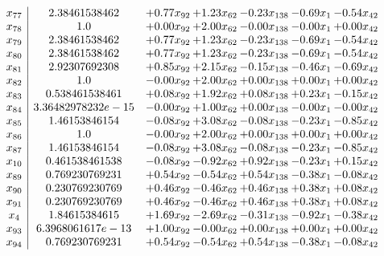 \documentclass[8pt]{article}
\begin{document}
\[\begin{array}{c| c c@{\hskip 2pt} c@{\hskip 2pt} c@{\hskip 2pt} c@{\hskip 2pt} c@{\hskip 2pt} }
 x_{77}   &  2.38461538462 & +  0.77 x_{92} & +  1.23 x_{62} & -0.23 x_{138} & -0.69 x_{1} & -0.54 x_{42}\\
 x_{78}   &  1.0 & +  0.00 x_{92} & +  2.00 x_{62} & -0.00 x_{138} & -0.00 x_{1} & +  0.00 x_{42}\\
 x_{79}   &  2.38461538462 & +  0.77 x_{92} & +  1.23 x_{62} & -0.23 x_{138} & -0.69 x_{1} & -0.54 x_{42}\\
 x_{80}   &  2.38461538462 & +  0.77 x_{92} & +  1.23 x_{62} & -0.23 x_{138} & -0.69 x_{1} & -0.54 x_{42}\\
 x_{81}   &  2.92307692308 & +  0.85 x_{92} & +  2.15 x_{62} & -0.15 x_{138} & -0.46 x_{1} & -0.69 x_{42}\\
 x_{82}   &  1.0 & -0.00 x_{92} & +  2.00 x_{62} & +  0.00 x_{138} & +  0.00 x_{1} & +  0.00 x_{42}\\
 x_{83}   &  0.538461538461 & +  0.08 x_{92} & +  1.92 x_{62} & +  0.08 x_{138} & +  0.23 x_{1} & -0.15 x_{42}\\
 x_{84}   &  3.36482978232e-15 & -0.00 x_{92} & +  1.00 x_{62} & +  0.00 x_{138} & -0.00 x_{1} & -0.00 x_{42}\\
 x_{85}   &  1.46153846154 & -0.08 x_{92} & +  3.08 x_{62} & -0.08 x_{138} & -0.23 x_{1} & -0.85 x_{42}\\
 x_{86}   &  1.0 & -0.00 x_{92} & +  2.00 x_{62} & +  0.00 x_{138} & +  0.00 x_{1} & +  0.00 x_{42}\\
 x_{87}   &  1.46153846154 & -0.08 x_{92} & +  3.08 x_{62} & -0.08 x_{138} & -0.23 x_{1} & -0.85 x_{42}\\
 x_{10}   &  0.461538461538 & -0.08 x_{92} & -0.92 x_{62} & +  0.92 x_{138} & -0.23 x_{1} & +  0.15 x_{42}\\
 x_{89}   &  0.769230769231 & +  0.54 x_{92} & -0.54 x_{62} & +  0.54 x_{138} & -0.38 x_{1} & -0.08 x_{42}\\
 x_{90}   &  0.230769230769 & +  0.46 x_{92} & -0.46 x_{62} & +  0.46 x_{138} & +  0.38 x_{1} & +  0.08 x_{42}\\
 x_{91}   &  0.230769230769 & +  0.46 x_{92} & -0.46 x_{62} & +  0.46 x_{138} & +  0.38 x_{1} & +  0.08 x_{42}\\
 x_{4}   &  1.84615384615 & +  1.69 x_{92} & -2.69 x_{62} & -0.31 x_{138} & -0.92 x_{1} & -0.38 x_{42}\\
 x_{93}   &  6.3968061617e-13 & +  1.00 x_{92} & -0.00 x_{62} & +  0.00 x_{138} & +  0.00 x_{1} & +  0.00 x_{42}\\
 x_{94}   &  0.769230769231 & +  0.54 x_{92} & -0.54 x_{62} & +  0.54 x_{138} & -0.38 x_{1} & -0.08 x_{42}\\

\end{array}\]
\end{document}
